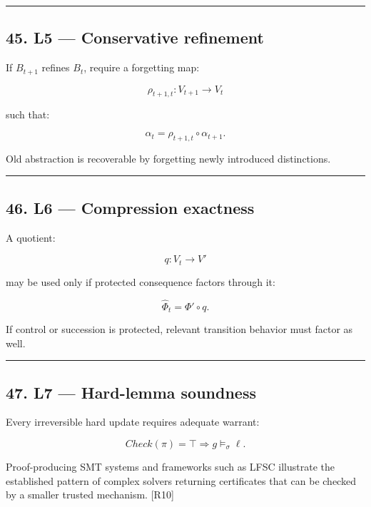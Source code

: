 \documentclass[
]{article}
\begin{document}
\begin{center}\rule{0.5\linewidth}{0.5pt}\end{center}

\subsection{45. L5 --- Conservative
refinement}\label{l5-conservative-refinement}

If \(B_{t+1}\) refines \(B_t\), require a forgetting map:

\[
\boxed{
\rho_{t+1,t}
:
V_{t+1}\to V_t
}
\]

such that:

\[
\boxed{
\alpha_t
=
\rho_{t+1,t}\circ\alpha_{t+1}.
}
\]

Old abstraction is recoverable by forgetting newly introduced
distinctions.

\begin{center}\rule{0.5\linewidth}{0.5pt}\end{center}

\subsection{46. L6 --- Compression
exactness}\label{l6-compression-exactness}

A quotient:

\[
q:V_t\to V'
\]

may be used only if protected consequence factors through it:

\[
\boxed{
\widehat\Phi_t
=
\Phi'\circ q.
}
\]

If control or succession is protected, relevant transition behavior must
factor as well.

\begin{center}\rule{0.5\linewidth}{0.5pt}\end{center}

\subsection{47. L7 --- Hard-lemma
soundness}\label{l7-hard-lemma-soundness}

Every irreversible hard update requires adequate warrant:

\[
\boxed{
Check(\pi)=\top
\Longrightarrow
g\models_\sigma\ell.
}
\]

Proof-producing SMT systems and frameworks such as LFSC illustrate the
established pattern of complex solvers returning certificates that can
be checked by a smaller trusted mechanism. {[}R10{]}
\end{document}
